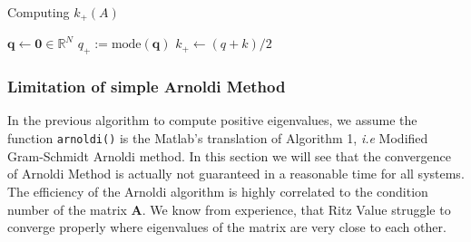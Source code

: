 \documentclass[11pt]{article}
\numberwithin{equation}{section}
\begin{document}
\begin{algorithm2e}
    \SetAlgoLined
    \caption{Computing $k_{+}(A)$}
    $\mathbf{q} \gets \mathbf{0}\in\mathbb{R}^{N}$\;
    $q_+ := \text{mode}(\mathbf{q}) $\;
    $k_+\gets (q+k)/2$
\end{algorithm2e}
\subsubsection{Limitation of simple Arnoldi Method}
In the previous algorithm to compute positive eigenvalues, we assume the function \texttt{arnoldi()} is the Matlab's translation of Algorithm 1, \textit{i.e} Modified Gram-Schmidt Arnoldi method. In this section we will see that the convergence of Arnoldi Method is actually not guaranteed in a reasonable time for all systems. The efficiency of the Arnoldi algorithm is highly correlated to the condition number of the matrix $\mathbf{A}$. We know from experience, that Ritz Value struggle to converge properly where eigenvalues of the matrix are very close to each other.
\end{document}
